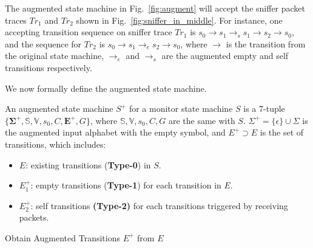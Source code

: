 The augmented state machine in Fig.~\ref{fig:augment} will accept the sniffer
packet traces $Tr_1$ and $Tr_2$ shown in Fig.~\ref{fig:sniffer_in_middle}.  For
instance, one accepting transition sequence on sniffer trace $Tr_1$ is
$s_0\rightarrow s_1 \rightarrow_s s_1\rightarrow s_2 \rightarrow s_0$, and the
sequence for $Tr_2$ is $s_0 \rightarrow s_1 \rightarrow_e s_2 \rightarrow s_0$,
where $\rightarrow$ is the transition from the original state machine,
$\rightarrow_e$ and $\rightarrow_s$ are the augmented empty and self transitions
respectively.

We now formally define the augmented state machine.

\begin{definition}
  An augmented state machine $S^+$ for a monitor state machine $S$ is a 7-tuple
  $\{\boldsymbol{\Sigma^+}, \mathbb{S}, \mathbb{V}, s_0, C, \boldsymbol{E^+},
  G\}$, where $\mathbb{S}, \mathbb{V}, s_0, C, G$ are the same with $S$.
  $\Sigma^+=\{\epsilon\} \cup \Sigma$ is the augmented input alphabet with the
  empty symbol, and $E^+ \supset E$ is the set of transitions, which includes:
  \begin{itemize}
    \item $E$: existing transitions (\textbf{Type-0}) in $S$.
    \item $E^+_1$: empty transitions (\textbf{Type-1}) for each transition in $E$.
    \item $E^+_2$: self transitions \textbf{(Type-2)} for each transitions
      triggered by receiving packets.
  \end{itemize}
\end{definition}

\setlength{\textfloatsep}{2mm}
\begin{algorithm}[h!]
  \caption{Obtain Augmented Transitions $E^+$ from $E$}
  \label{alg:augment}
  \begin{algorithmic}[1]
      \label{alg:augment:type0}
      \label{alg:augment:type1}
        \label{alg:augment:type2}
      \EndIf
    \EndFor
    \State {}
    \EndFunction
  \end{algorithmic}
\end{algorithm}


